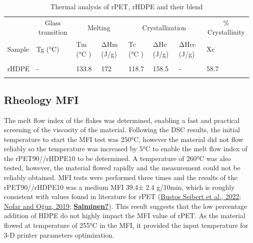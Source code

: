 \documentclass[
  12pt,
  number,
  review]{elsarticle}
\begin{document}
\begin{table}
\caption{Thermal analysis of rPET, rHDPE and their blend}\tabularnewline

\centering\begingroup\fontsize{7}{9}\selectfont

\begin{tabular}[t]{llllllll}
\toprule
\multicolumn{1}{c}{ } & \multicolumn{1}{c}{Glass transition} & \multicolumn{2}{c}{Melting} & \multicolumn{3}{c}{Crystallization } & \multicolumn{1}{c}{\% Crystallinity} \\
\cmidrule(l{3pt}r{3pt}){2-2} \cmidrule(l{3pt}r{3pt}){3-4} \cmidrule(l{3pt}r{3pt}){5-7} \cmidrule(l{3pt}r{3pt}){8-8}
Sample & Tg (°C) & Tm  (°C ) & ΔHm (J/g) & Tc  (°C ) & ΔHc (J/g) & ΔHcc (J/g) & Xc\\
\midrule
\cellcolor{gray!6}{rPET} & \cellcolor{gray!6}{82} & \cellcolor{gray!6}{249.9} & \cellcolor{gray!6}{31.6} & \cellcolor{gray!6}{196.7} & \cellcolor{gray!6}{34.8} & \cellcolor{gray!6}{-} & \cellcolor{gray!6}{22.6}\\
rHDPE & - & 133.8 & 172 & 118.7 & 158.5 & - & 58.7\\
\cellcolor{gray!6}{rPET90/rHDPE10} & \cellcolor{gray!6}{77 / -} & \cellcolor{gray!6}{254/131.7} & \cellcolor{gray!6}{40.3/1.30} & \cellcolor{gray!6}{210.6/117.4} & \cellcolor{gray!6}{37.9/6.7} & \cellcolor{gray!6}{6.8} & \cellcolor{gray!6}{24.8 / 18.4}\\
\bottomrule
\end{tabular}
\endgroup{}
\end{table}

\hypertarget{rheology-mfi}{%
\subsection{Rheology MFI}\label{rheology-mfi}}

The melt flow index of the flakes was determined, enabling a fast and
practical screening of the viscosity of the material. Following the DSC
results, the initial temperature to start the MFI test was 250°C,
however the material did not flow reliably so the temperature was
increased by 5°C to enable the melt flow index of the rPET90//rHDPE10 to
be determined. A temperature of 260°C was also tested, however, the
material flowed rapidly and the measurement could not be reliably
obtained. MFI tests were performed three times and the results of the
rPET90//rHDPE10 was a medium MFI 39.4± 2.4 g/10min, which is roughly
consistent with values found in literature for rPET
(\protect\hyperlink{ref-bustosseibert2022}{Bustos Seibert et al., 2022};
\protect\hyperlink{ref-nofar2019}{Nofar and Oğuz, 2019};
\protect\hyperlink{ref-Salminen}{\textbf{Salminen?}}). This result
suggests that the low percentage addition of HDPE do not highly impact
the MFI value of rPET. As the material flowed at temperature of 255°C in
the MFI, it provided the input temperature for 3-D printer parameters
optimization.
\end{document}
